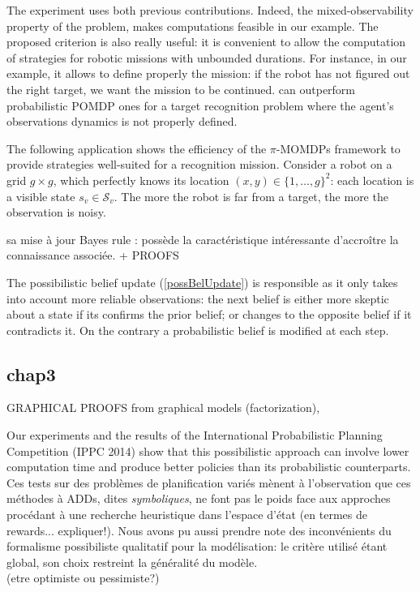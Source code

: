 The experiment uses both previous contributions.
Indeed, the mixed-observability property of the problem,
makes computations feasible in our example.
The proposed criterion is also really useful: 
it is convenient to allow the computation of strategies 
for robotic missions with unbounded durations.
For instance, in our example, 
it allows to define properly the mission: 
if the robot has not figured out the right target,
we want the mission to be continued.
can outperform probabilistic POMDP ones 
for a target recognition problem 
where the agent's observations dynamics 
is not properly defined.

The following application shows the efficiency 
of the $\pi$-MOMDPs framework to provide strategies
well-suited for a recognition mission. 
Consider a robot on a grid $g \times g$, 
which perfectly knows its location $(x,y) \in \{ 1, \ldots, g \}^2$:
each location is a visible state $s_v \in \mathcal{S}_v$. 
The more the robot is far from a target, 
the more the observation is noisy. 

sa mise \`a jour Bayes rule \cite{Dubois199023}: 
poss\`ede la caract\'eristique int\'eressante d'accro\^itre la connaissance associ\'ee.
+ PROOFS

The possibilistic belief update (\ref{possBelUpdate})
is responsible as it only takes into account 
more reliable observations:
the next belief is either more skeptic 
about a state if its confirms the prior belief; 
or changes to the opposite belief if it contradicts it.
On the contrary a probabilistic belief is modified at each step. 


\subsection*{chap3}
GRAPHICAL PROOFS from graphical models (factorization),

Our experiments and the  results 
of the International Probabilistic Planning Competition (IPPC 2014)
show that this possibilistic approach
can involve lower computation time
and produce better policies
than its probabilistic counterparts.
Ces tests sur des probl\`emes de planification vari\'es m\`enent \`a l'observation que 
ces m\'ethodes \`a ADDs, dites \textit{symboliques}, ne font pas le poids face aux
approches proc\'edant \`a une recherche heuristique dans l'espace d'\'etat \cite{DBLP:conf/aips/KellerE12} (en termes de rewards... expliquer!). 
Nous avons pu aussi prendre note des inconv\'enients du formalisme possibiliste qualitatif pour la mod\'elisation:
le crit\`ere utilis\'e \'etant global, son choix restreint la g\'en\'eralit\'e du mod\`ele.\\
(etre optimiste ou pessimiste?)

